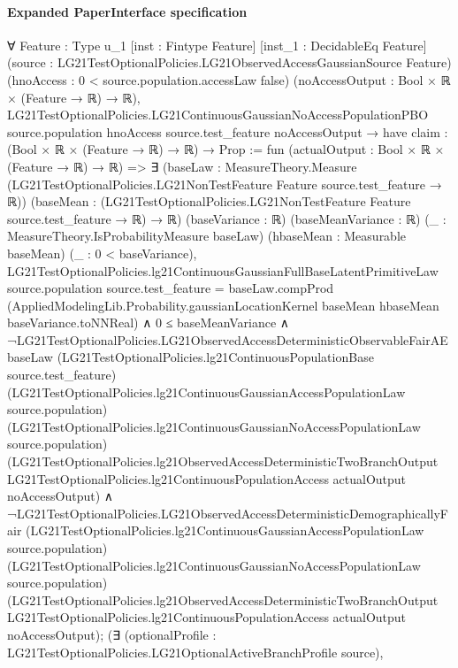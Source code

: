 \documentclass[10pt]{article}
\begin{document}
\paragraph{Expanded PaperInterface specification}
\begin{ReviewVerbatim}
∀ {Feature : Type u_1} [inst : Fintype Feature] [inst_1 : DecidableEq Feature]
  (source : LG21TestOptionalPolicies.LG21ObservedAccessGaussianSource Feature)
  (hnoAccess : 0 < source.population.accessLaw {false}) (noAccessOutput : Bool × ℝ × (Feature → ℝ) → ℝ),
  LG21TestOptionalPolicies.LG21ContinuousGaussianNoAccessPopulationPBO source.population hnoAccess source.test_feature
      noAccessOutput →
    have claim : (Bool × ℝ × (Feature → ℝ) → ℝ) → Prop := fun (actualOutput : Bool × ℝ × (Feature → ℝ) → ℝ) =>
      ∃ (baseLaw : MeasureTheory.Measure (LG21TestOptionalPolicies.LG21NonTestFeature Feature source.test_feature → ℝ))
        (baseMean : (LG21TestOptionalPolicies.LG21NonTestFeature Feature source.test_feature → ℝ) → ℝ) (baseVariance :
        ℝ) (baseMeanVariance : ℝ) (_ : MeasureTheory.IsProbabilityMeasure baseLaw) (hbaseMean : Measurable baseMean) (_
        : 0 < baseVariance),
        LG21TestOptionalPolicies.lg21ContinuousGaussianFullBaseLatentPrimitiveLaw source.population
              source.test_feature =
            baseLaw.compProd
              (AppliedModelingLib.Probability.gaussianLocationKernel baseMean hbaseMean baseVariance.toNNReal) ∧
          0 ≤ baseMeanVariance ∧
            ¬LG21TestOptionalPolicies.LG21ObservedAccessDeterministicObservableFairAE baseLaw
                  (LG21TestOptionalPolicies.lg21ContinuousPopulationBase source.test_feature)
                  (LG21TestOptionalPolicies.lg21ContinuousGaussianAccessPopulationLaw source.population)
                  (LG21TestOptionalPolicies.lg21ContinuousGaussianNoAccessPopulationLaw source.population)
                  (LG21TestOptionalPolicies.lg21ObservedAccessDeterministicTwoBranchOutput
                    LG21TestOptionalPolicies.lg21ContinuousPopulationAccess actualOutput noAccessOutput) ∧
              ¬LG21TestOptionalPolicies.LG21ObservedAccessDeterministicDemographicallyFair
                  (LG21TestOptionalPolicies.lg21ContinuousGaussianAccessPopulationLaw source.population)
                  (LG21TestOptionalPolicies.lg21ContinuousGaussianNoAccessPopulationLaw source.population)
                  (LG21TestOptionalPolicies.lg21ObservedAccessDeterministicTwoBranchOutput
                    LG21TestOptionalPolicies.lg21ContinuousPopulationAccess actualOutput noAccessOutput);
    (∃ (optionalProfile : LG21TestOptionalPolicies.LG21OptionalActiveBranchProfile source),

\end{ReviewVerbatim}
\end{document}
